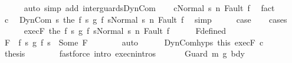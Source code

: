 \begin{isabellebody}
\ \ \ \ \isamarkupfalse%
\ {\isacharparenleft}auto\ simp\ add{\isacharcolon}\ inter{\isacharunderscore}guards{\isacharunderscore}DynCom{\isacharparenright}\isanewline
\ \ \isamarkupfalse%
\ {\isachardoublequoteopen}{\isasymGamma}{\isasymturnstile}{\isasymlangle}c{\isacharcomma}Normal\ s{\isasymrangle}\ {\isacharequal}n{\isasymRightarrow}\ Fault\ f{\isachardoublequoteclose}\ \isamarkupfalse%
\ fact\isanewline
\ \ \isamarkupfalse%
\ c\ \isamarkupfalse%
\ {\isachardoublequoteopen}{\isasymGamma}{\isasymturnstile}{\isasymlangle}DynCom\ {\isacharparenleft}{\isasymlambda}s{\isachardot}\ the\ {\isacharparenleft}{\isacharparenleft}f{}\ s{\isacharparenright}\ {\isasyminter}\isactrlsub g\ {\isacharparenleft}f{}\ s{\isacharparenright}{\isacharparenright}{\isacharparenright}{\isacharcomma}Normal\ s{\isasymrangle}\ {\isacharequal}n{\isasymRightarrow}\ Fault\ f{\isachardoublequoteclose}\ \isamarkupfalse%
\ simp\isanewline
\ \ \isamarkupfalse%
\ \isamarkupfalse%
\ {\isacharquery}case\isanewline
\ \ \isamarkupfalse%
\ {\isacharparenleft}cases{\isacharparenright}\isanewline
\ \ \ \ \isamarkupfalse%
\ exec{\isacharunderscore}F{\isacharcolon}\ {\isachardoublequoteopen}{\isasymGamma}{\isasymturnstile}{\isasymlangle}the\ {\isacharparenleft}f{}\ s\ {\isasyminter}\isactrlsub g\ f{}\ s{\isacharparenright}{\isacharcomma}Normal\ s{\isasymrangle}\ {\isacharequal}n{\isasymRightarrow}\ Fault\ f{\isachardoublequoteclose}\isanewline
\ \ \ \ \isamarkupfalse%
\ F{\isacharunderscore}defined\ \isamarkupfalse%
\ F\ \ {\isachardoublequoteopen}{\isacharparenleft}f{}\ s\ {\isasyminter}\isactrlsub g\ f{}\ s{\isacharparenright}\ {\isacharequal}\ Some\ F{\isachardoublequoteclose}\isanewline
\ \ \ \ \ \ \isamarkupfalse%
\ auto\isanewline
\ \ \ \ \isamarkupfalse%
\ DynCom{\isachardot}hyps\ this\ exec{\isacharunderscore}F\ c{}\ \isanewline
\ \ \ \ \isamarkupfalse%
\ {\isacharquery}thesis\isanewline
\ \ \ \ \ \ \isamarkupfalse%
\ {\isacharparenleft}fastforce\ intro{\isacharcolon}\ execn{\isachardot}intros{\isacharparenright}\isanewline
\ \ \isamarkupfalse%
\isanewline
{}\isamarkupfalse%
\isanewline
\ \ \isamarkupfalse%
\ {\isacharparenleft}Guard\ m\ g{}\ bdy{}{\isacharparenright}\isanewline

\end{isabellebody}

